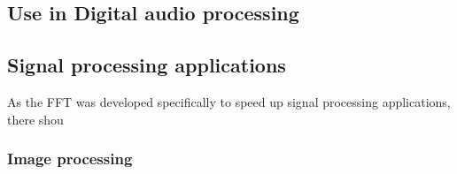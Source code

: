 \subsection{Use in Digital audio processing}

\subsection{Signal processing applications}
As the FFT was developed specifically to speed up signal processing applications, there shou

\subsubsection{Image processing}